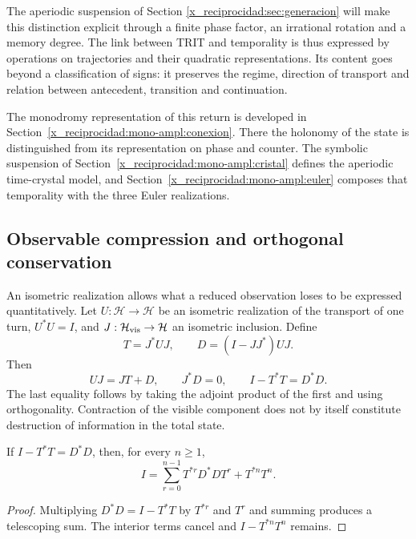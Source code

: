 The aperiodic suspension of Section \ref{x_reciprocidad:sec:generacion} will make
this distinction explicit through a finite phase factor, an irrational rotation
and a memory degree. The link between TRIT and temporality is thus
expressed by operations on trajectories and their quadratic
representations. Its content goes beyond a classification of signs: it preserves the
regime, direction of transport and relation between antecedent,
transition and continuation.



The monodromy representation of this return is developed in
Section~\ref{x_reciprocidad:mono-ampl:conexion}. There the holonomy of the
state is distinguished from its representation on phase and counter. The symbolic
suspension of Section~\ref{x_reciprocidad:mono-ampl:cristal} defines the
aperiodic time-crystal model, and Section~\ref{x_reciprocidad:mono-ampl:euler}
composes that temporality with the three Euler realizations.

\subsection{Observable compression and orthogonal conservation}

An isometric realization allows what a reduced observation loses to be expressed quantitatively. Let \(U:\mathcal H\to\mathcal H\) be an isometric realization of the transport of one turn, \(U^*U=I\), and \(J:\mathcal H_{\rm vis}\to\mathcal H\) an isometric inclusion. Define
\[
 T=J^*UJ,\qquad D=(I-JJ^*)UJ.
\]
Then
\begin{equation}
 UJ=JT+D,\qquad J^*D=0,\qquad I-T^*T=D^*D.
 \label{x_reciprocidad:eq:conservacion-ortogonal}
\end{equation}
The last equality follows by taking the adjoint product of the first and using orthogonality. Contraction of the visible component does not by itself constitute destruction of information in the total state.

\begin{proposition}
If \(I-T^*T=D^*D\), then, for every \(n\ge1\),
\begin{equation}
 I=\sum_{r=0}^{n-1}T^{*r}D^*DT^r+T^{*n}T^n.
 \label{x_reciprocidad:eq:telescopia}
\end{equation}
\end{proposition}
\begin{proof}
Multiplying \(D^*D=I-T^*T\) by \(T^{*r}\) and \(T^r\) and summing produces a telescoping sum. The interior terms cancel and \(I-T^{*n}T^n\) remains.
\end{proof}

